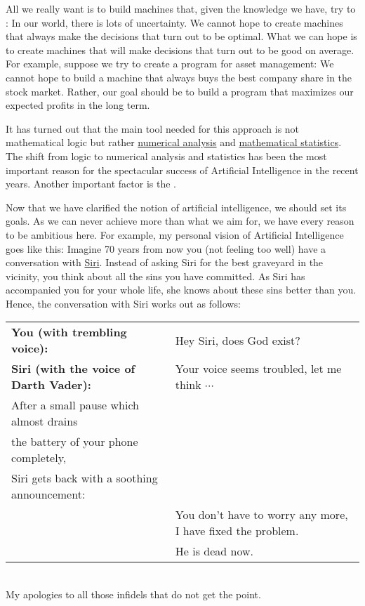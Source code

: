 \begin{enumerate}
      All we really want is to build machines that, given the knowledge we have, try to 
      :  In our world, there is lots of uncertainty.  We cannot
      hope to create 
      machines that always make the decisions that turn out to be optimal.  What we can
      hope is to create machines that will make decisions that turn out to be good on average.  For
      example, suppose we try to create a program for asset management:  We cannot hope to build a
      machine that always buys the best company share in the stock market.  Rather, our goal should
      be to build a program that maximizes our expected profits in the long term.

      It has turned out that the main tool needed for this approach is not mathematical logic but
      rather \href{https://en.wikipedia.org/wiki/Numerical_analysis}{numerical analysis} and
      \href{https://en.wikipedia.org/wiki/Mathematical_statistics}{mathematical statistics}.  The shift 
      from logic to numerical analysis and statistics has been the most important reason for the spectacular
      success of Artificial Intelligence in the recent years.  Another important factor is the 
      . 
\end{enumerate}
Now that we have clarified the notion of artificial intelligence, we should set its goals.  As we
can never achieve more than what we aim for, we have every reason to be ambitious here.  For example, my
personal vision of Artificial Intelligence goes like this: 
Imagine 70 years from now you (not feeling too well) have a conversation with
\href{https://en.wikipedia.org/wiki/Siri}{Siri}.  Instead of asking Siri for the
best graveyard in the vicinity, you think about all the sins you have committed.  As Siri has
accompanied you for your whole life, she knows about these sins better than you.  Hence,  
the conversation with Siri works out as follows: 
\\[0.2cm]
\begin{tabular}[t]{ll}
\textbf{You (with trembling voice):}           & Hey Siri, does God exist?                   \\[0.2cm]
\textbf{Siri (with the voice of Darth Vader):} & Your voice seems troubled, let me think $\cdots$ \\
After a small pause which almost drains \\
the battery of your phone completely, \\
Siri gets back with a soothing announcement: \\           
                                     & You don't have to worry any more, I have fixed the problem.  \\
                                     & He is dead now.  
\end{tabular}
\\[0.2cm]
My apologies to all those infidels that do not get the point.
\pagebreak

